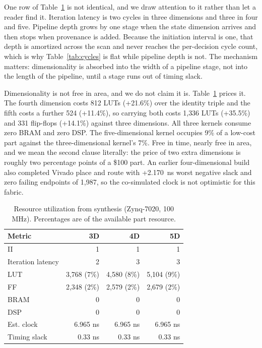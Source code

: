 \documentclass[conference]{IEEEtran}
\newcommand{\new}[1]{\textcolor{hkred}{#1}}
\begin{document}
\new{One row of Table~\ref{tab:resources} is not identical, and we draw attention to it rather than let a reader find it. Iteration latency is two cycles in three dimensions and three in four and five. Pipeline depth grows by one stage when the state dimension arrives and then stops when provenance is added. Because the initiation interval is one, that depth is amortized across the scan and never reaches the per-decision cycle count, which is why Table~\ref{tab:cycles} is flat while pipeline depth is not. The mechanism matters: dimensionality is absorbed into the width of a pipeline stage, not into the length of the pipeline, until a stage runs out of timing slack.}

\new{Dimensionality} is not free in area, and we do not claim it is. Table~\ref{tab:resources} \new{prices it. The fourth dimension costs 812 LUTs (+21.6\%) over the identity triple and the fifth costs a further 524 (+11.4\%), so carrying both costs 1{,}336 LUTs (+35.5\%) and 331 flip-flops (+14.1\%) against three dimensions. All three kernels consume zero BRAM and zero DSP. The five-dimensional kernel occupies 9\% of a low-cost part against the three-dimensional kernel's 7\%. Free in time, nearly free in area, and we mean the second clause literally: the price of two extra dimensions is roughly two percentage points of a \$100 part.} An earlier four-dimensional build also completed Vivado place and route with +2.170~ns worst negative slack and zero failing endpoints of 1{,}987, so the co-simulated clock is not optimistic for this fabric.

\begin{table}[t]
\caption{Resource utilization from synthesis (Zynq-7020, 100 MHz). \new{Percentages are of the available part resource.}}
\label{tab:resources}
\centering
\begin{tabular}{lrrr}
\toprule
Metric & \new{3D} & 4D & 5D \\
\midrule
II & \new{1} & 1 & 1 \\
Iteration latency & \new{2} & 3 & 3 \\
LUT & \new{3{,}768 (7\%)} & 4{,}580 (8\%) & 5{,}104 (9\%) \\
FF & \new{2{,}348 (2\%)} & 2{,}579 (2\%) & 2{,}679 (2\%) \\
BRAM & \new{0} & 0 & 0 \\
DSP & \new{0} & 0 & 0 \\
\new{Est. clock} & \new{6.965 ns} & \new{6.965 ns} & \new{6.965 ns} \\
Timing slack & \new{0.33 ns} & 0.33 ns & 0.33 ns \\
\bottomrule
\end{tabular}
\end{table}
\end{document}
